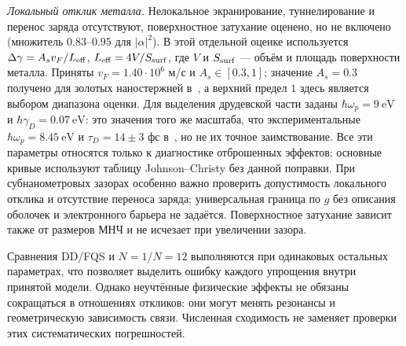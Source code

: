 \emph{Локальный отклик металла.} Нелокальное экранирование, туннелирование и
перенос заряда отсутствуют, поверхностное затухание оценено, но не включено
(множитель $0.83$--$0.95$ для $|\alpha|^2$). В этой отдельной оценке
используется $\Delta\gamma=A_s v_F/L_{\rm eff}$,
$L_{\rm eff}=4V/S_{\rm surf}$, где $V$ и $S_{\rm surf}$ --- объём
и площадь поверхности металла. Приняты $v_F=1.40\cdot10^6$ м/с
и $A_s\in[0.3,1]$; значение $A_s=0.3$ получено для золотых наностержней
в~\cite{novo2006}, а верхний предел $1$ здесь является выбором диапазона
оценки. Для выделения друдевской части заданы
$\hbar\omega_p=\SI{9}{\electronvolt}$ и
$\hbar\gamma_D=\SI{0.07}{\electronvolt}$: это значения того же масштаба,
что экспериментальные $\hbar\omega_p=\SI{8.45}{\electronvolt}$ и
$\tau_D=14\pm3$ фс в~\cite{olmon2012}, но не их точное заимствование.
Все эти параметры относятся только к диагностике отброшенных эффектов;
основные кривые используют таблицу Johnson--Christy без данной поправки.
При субнанометровых зазорах
особенно важно проверить допустимость локального отклика и отсутствие
переноса заряда; универсальная граница по $g$ без описания оболочек
и электронного барьера не задаётся. Поверхностное затухание зависит также
от размеров МНЧ и не исчезает при увеличении зазора.

Сравнения DD/FQS и $N=1$/$N=12$ выполняются при одинаковых остальных
параметрах, что позволяет выделить ошибку каждого упрощения внутри
принятой модели. Однако неучтённые физические эффекты не обязаны
сокращаться в отношениях откликов: они могут менять резонансы и
геометрическую зависимость связи. Численная сходимость не заменяет
проверки этих систематических погрешностей.
